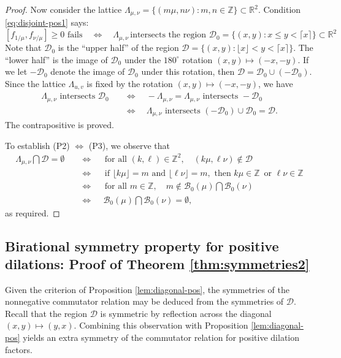 \documentclass[11pt, letterpaper, reqno]{amsart}
\theoremstyle{definition}
\numberwithin{equation}{section}
\newcommand{\RR}{\ensuremath{\mathbb{R}}}
\newcommand{\ZZ}{\ensuremath{\mathbb{Z}}}
\newcommand{\sB}{\mathcal{B}}
\newcommand{\floor}[1]{\lfloor{#1}\rfloor}
\newcommand{\ceil}[1]{\lceil{#1}\rceil}
\newcommand{\um}{{\mu}}
\newcommand{\vm}{{\nu}}
\newcommand{\cD}{\mathcal{D}}
\begin{document}
{\begin{proof}
Now consider the lattice $ \Lambda_{\um,\vm} = \{ (m \um, n \vm) : m,n\in\ZZ\} \subset \RR^2$.
Condition \eqref{eq:disjoint-pos1} says:
$$ 
[f_{1/\um}, f_{\vm/\um}] \geq 0 \,\, \mbox{fails} \quad \Leftrightarrow \quad
\Lambda_{\um,\vm} \, \mbox{intersects the region} \,\, 
\cD_0 = \{ (x,y) :  x \leq y < \ceil{x} \} \subset \RR^2
$$
Note that $\cD_0$ is  the ``upper half'' of the region $\cD = \{ (x,y) : \floor{x} < y < \ceil{x} \}$.
The ``lower half'' is the image of $\cD_0$ under the $180^\circ$ rotation $(x,y) \mapsto (-x,-y)$. 
If we let $-\cD_0$ denote the image of $\cD_0$ under this rotation, then $\cD = \cD_0\cup(-\cD_0)$.
Since the lattice $\Lambda_{u,v}$ is fixed by the rotation $(x,y) \mapsto (-x,-y)$, we have
\begin{align*}
\Lambda_{\um,\vm} \text{ intersects } \cD_0 &\quad\Leftrightarrow\quad 
 -\Lambda_{\um,\vm}=\Lambda_{\um,\vm} \text{ intersects } -\cD_0\\
 &\quad\Leftrightarrow\quad 
 \Lambda_{\um,\vm} \text{ intersects } (-\cD_0)\cup \cD_0 = \cD.
\end{align*}
The contrapositive is proved. 

To establish (P2) $\Leftrightarrow$  (P3), we observe that
\begin{align*}
 \Lambda_{\um,\vm} \bigcap \mathcal{D} = \emptyset  &\quad\Leftrightarrow\quad
  \text{ for all } (k,\ell) \in \ZZ^2, \quad  (k \um, \ell \vm) \not\in \cD\\
 &\quad\Leftrightarrow\quad  \text{ if } \floor{k \um}=m  \text{ and }  \floor{\ell \vm}= m,  \text{ then } 
  k \um \in \ZZ \, \text{ or } \ell \vm \in \ZZ \\
 &\quad\Leftrightarrow\quad  \text{ for all }m \in \ZZ,\quad m\not\in \sB_0(\um) \bigcap \sB_0(\vm) \\
 &\quad\Leftrightarrow\quad \,\sB_0(\um) \bigcap \sB_0(\vm)  =\emptyset,
\end{align*}
as required.
\end{proof}

%
%
\subsection{Birational symmetry property for positive dilations: Proof of Theorem \ref{thm:symmetries2}}

Given the criterion of Proposition \ref{lem:diagonal-pos}, the symmetries of the nonnegative commutator relation may be deduced from the symmetries of $\cD$.
Recall that the region $\mathcal{D}$ is symmetric by reflection across the diagonal $(x,y) \mapsto (y,x)$.
Combining this observation with Proposition \ref{lem:diagonal-pos} yields
an extra symmetry of the commutator relation for
 positive dilation factors.

}
\end{document}
